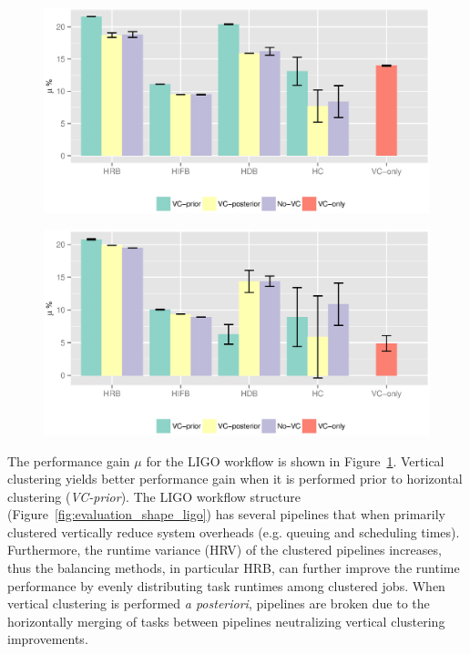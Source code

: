 \begin{figure}[!htb]
	\centering
	\includegraphics[width=1.0\linewidth]{figures/balance/figure26.eps}
	\label{fig:evaluation_vc_ligo}
\end{figure}


\begin{figure}[!htb]
	\centering
	\includegraphics[width=1.0\linewidth]{figures/balance/figure27.eps}
	\label{fig:evaluation_vc_genome}
\end{figure}

The performance gain $\mu$ for the LIGO workflow is shown in Figure~\ref{fig:evaluation_vc_ligo}. Vertical clustering yields better performance gain when it is performed prior to horizontal clustering (\emph{VC-prior}). The LIGO workflow structure (Figure~\ref{fig:evaluation_shape_ligo}) has several pipelines that when primarily clustered vertically reduce system overheads (e.g. queuing and scheduling times). Furthermore, the runtime variance (HRV) of the clustered pipelines increases, thus the balancing methods, in particular HRB, can further improve the runtime performance by evenly distributing task runtimes among clustered jobs. When vertical clustering is performed \emph{a posteriori}, pipelines are broken due to the horizontally merging of tasks between pipelines neutralizing vertical clustering improvements.





